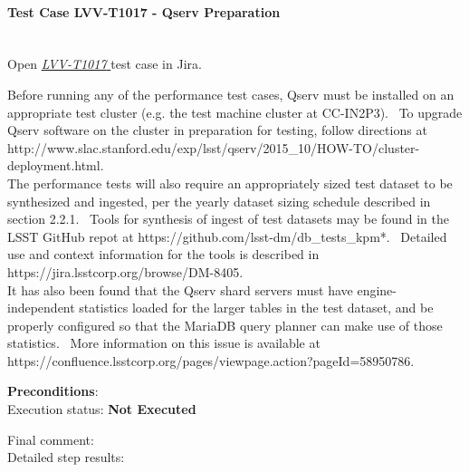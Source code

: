\documentclass[DM,lsstdraft,STR,toc]{lsstdoc}
\begin{document}
    \paragraph{Test Case LVV-T1017 - Qserv Preparation
 }\mbox{}\\

Open  \href{https://jira.lsstcorp.org/secure/Tests.jspa#/testCase/LVV-T1017}{\textit{ LVV-T1017 } }
test case in Jira.

    Before running any of the performance test cases, Qserv must be
installed on an appropriate test cluster (e.g. the test machine cluster
at CC-IN2P3). ~To upgrade Qserv software on the cluster in preparation
for testing, follow directions at
http://www.slac.stanford.edu/exp/lsst/qserv/2015\_10/HOW-TO/cluster-deployment.html.\\[2\baselineskip]The
performance tests will also require an appropriately sized test dataset
to be synthesized and ingested, per the yearly dataset sizing schedule
described in section 2.2.1. ~Tools for synthesis of ingest of test
datasets may be found in the LSST GitHub repot at
https://github.com/lsst-dm/db\_tests\_kpm*. ~Detailed use and context
information for the tools is described in
https://jira.lsstcorp.org/browse/DM-8405.\\[2\baselineskip]It has also
been found that the Qserv shard servers must have engine-independent
statistics loaded for the larger tables in the test dataset, and be
properly configured so that the MariaDB query planner can make use of
those statistics. ~More information on this issue is available at
https://confluence.lsstcorp.org/pages/viewpage.action?pageId=58950786.


    \textbf{ Preconditions}:\\
    

    Execution status: {\bf Not Executed }

    Final comment:\\


    Detailed step results:
\end{document}
